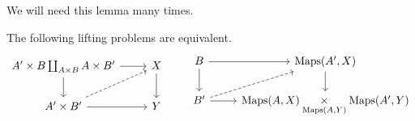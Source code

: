 \documentclass[main.tex]{subfiles}
\begin{document}
We will need this lemma many times.
\begin{lemma}
  \label{lemma:equivalent_lifting_problems}
  The following lifting problems are equivalent.
  \begin{equation*}
    \begin{tikzcd}
      A' \times B \coprod_{A \times B} A \times B'
      \arrow[r]
      \arrow[d]
      & X
      \arrow[d]
      \\
      A' \times B'
      \arrow[r]
      \arrow[ur, dashed]
      & Y
    \end{tikzcd}
    \qquad
    \begin{tikzcd}
      B
      \arrow[r]
      \arrow[d]
      & \Maps(A', X)
      \arrow[d]
      \\
      B'
      \arrow[r]
      \arrow[ur, dashed]
      & \Maps(A, X) \underset{\Maps(A, Y)}{\times} \Maps(A', Y)
    \end{tikzcd}
  \end{equation*}
\end{lemma}
\end{document}
